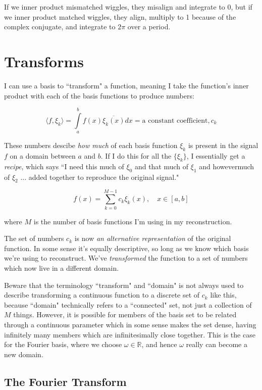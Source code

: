 \documentclass[10pt]{article}
\begin{document}
If we inner product mismatched wiggles, they misalign and integrate to 0, but if we inner product matched wiggles, they align, multiply to 1 because of the complex conjugate, and integrate to $2\pi$ over a period.

\section{Transforms}

I can use a basis to ``transform" a function, meaning I take the function's inner product with each of the basis functions to produce numbers:

$$ \langle f,\xi_k \rangle = \int\limits_{a}^{b} f(x) \overline{\xi_k(x)} dx = \text{a constant coefficient}, c_k $$

These numbers descibe \textit{how much} of each basis function $\xi_k$ is present in the signal $f$ on a domain between $a$ and $b$. If I do this for all the $\{\xi_k\}$, I essentially get a \textit{recipe}, which says ``I need this much of $\xi_0$ and that much of $\xi_1$ and howevermuch of $\xi_2$ ... added together to reproduce the original signal."

$$ f(x) = \sum_{k=0}^{M-1} c_k \xi_k(x), \quad x \in [a, b] $$

where $M$ is the number of basis functions I'm using in my reconstruction.\newline

The set of numbers $c_k$ is now \textit{an alternative representation} of the original function. In some sense it's equally descriptive, so long as we know which basis we're using to reconstruct. We've \textit{transformed} the function to a set of numbers which now live in a different domain.

Beware that the terminology ``transform" and ``domain" is not always used to describe transforming a continuous function to a discrete set of $c_k$ like this, because ``domain" technically refers to a ``connected" set, not just a collection of $M$ things. However, it is possible for members of the basis set to be related through a continuous parameter which in some sense makes the set dense, having infinitely many members which are infinitesimally close together. This is the case for the Fourier basis, where we choose $\omega \in \mathbb{R}$, and hence $\omega$ really can become a new domain.

\subsection{The Fourier Transform}\label{fourierT}
\end{document}
